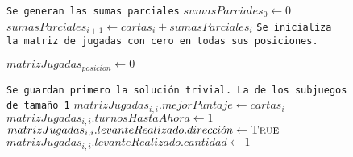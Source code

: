 \documentclass[11pt, a4paper, twoside]{article}
\begin{document}
\begin{figure}
\begin{algorithm}[H]
\begin{algorithmic}[1]
	
	\Statex \texttt{Se generan las sumas parciales}
	\State $sumasParciales_0 \gets 0$ 										
										
		\State $sumasParciales_{i+1} \gets cartas_i + sumasParciales_{i}$	
	\EndFor
	\Statex
	\Statex \texttt{Se inicializa la matriz de jugadas con cero en todas sus posiciones.}
	
					
		\State $matrizJugadas_{posici \acute{o}n} \gets 0$					
	\EndFor
	
	\Statex
	\Statex \texttt{Se guardan primero la solución trivial. La de los subjuegos de tamaño 1}
								
		\State $matrizJugadas_{i,i}.mejorPuntaje \gets cartas_i$			 \label{alg:ej1-trivial}
		\State $matrizJugadas_{i,i}.turnosHastaAhora \gets 1$				
		\State $matrizJugadas_{i,i}.levanteRealizado.direcci \acute{o}n \gets \Call{True}{}$ 
		\State $matrizJugadas_{i,i}.levanteRealizado.cantidad \gets 1$ 		
	\EndFor
\end{algorithmic}
\end{algorithm}

\end{figure}
\end{document}
